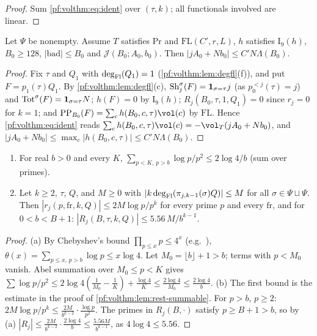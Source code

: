 \begin{proof}
Sum \eqref{pf:volthm:eq:ident} over $(\tau,k)$; all functionals involved are linear.
\end{proof}

\begin{lemma}\label{pf:volthm:lem:flat}
Let $\Psi$ be nonempty. Assume $T$ satisfies $\mathrm{Pr}$ and $\mathrm{FL}(C',r,L)$, $h$ satisfies
$\mathrm{I}_9(h)$, $B_0\ge128$, $|\mathrm{bad}|\le B_0$ and $\mathcal J(B_0;A_0,b_0)$. Then
$|jA_0+Nb_0|\le C'N\Lambda(B_0)$.
\end{lemma}

\begin{proof}
Fix $\tau$ and $Q_1$ with $\deg_{\mathrm{Fl}}(Q_1)=1$ (\cref{pf:volthm:lem:degfl}(f)), and put $F=p_1(\tau)Q_1$. By
\cref{pf:volthm:lem:degfl}(c), $\mathrm{Sh}_j^\sigma(F)=\mathbf 1_{\sigma=\tau}j$ (as $p^{<j}_0(\tau)=j$) and
$\mathrm{Tot}^\sigma(F)=\mathbf 1_{\sigma=\tau}N$; $h(F)=0$ by $\mathrm{I}_9(h)$; $R_j(B_0,\tau,1,Q_1)=0$ since $r_j=0$
for $k=1$; and $\volthmPP_{B_0}(F)=\sum_ch(B_0,c,\tau)\vol(c)$ by $\mathrm{FL}$. Hence \eqref{pf:volthm:eq:ident}
reads $\sum_ch(B_0,c,\tau)\vol(c)=-\vol_T(jA_0+Nb_0)$, and $|jA_0+Nb_0|\le\max_c|h(B_0,c,\tau)|\le C'N\Lambda(B_0)$.
\end{proof}

\begin{lemma}\label{pf:volthm:lem:primesums}
\begin{enumerate}[label=(\alph*)]
\item For real $b>0$ and every $K$, $\sum_{p<K,\ p>b}\log p/p^2\le2\log4/b$ (sum over primes).
\item Let $k\ge2$, $\tau$, $Q$, and $M\ge0$ with $|k\deg_{\mathrm{Fl}}(\pi_{j,k-1}(\sigma)Q)|\le M$ for all $\sigma\in\Psi\sqcup
  \Psi$. Then $|r_j(p,\mathrm{fr},k,Q)|\le2M\log p/p^k$ for every prime $p$ and every $\mathrm{fr}$, and for
  $0<b<B+1$: $|R_j(B,\tau,k,Q)|\le5.56\,M/b^{k-1}$.
\end{enumerate}
\end{lemma}

\begin{proof}
(a) By Chebyshev's bound $\prod_{p\le x}p\le4^x$ (e.g.\ \cite[Thm.~415]{HardyWright2008}),
$\theta(x)=\sum_{p\le x,\,p>b}\log p\le x\log4$. Let $M_0=\lfloor b\rfloor+1>b$; terms with $p<M_0$ vanish. Abel
summation over $M_0\le p<K$ gives
$\sum\log p/p^2\le2\log4(\frac1{M_0}-\frac1K)+\frac{\log4}K\le\frac{2\log4}{M_0}\le\frac{2\log4}b$.
(b) The first bound is the estimate in the proof of \cref{pf:volthm:lem:rest-summable}. For $p>b$, $p\ge2$:
$2M\log p/p^k\le\frac{2M}{b^{k-2}}\cdot\frac{\log p}{p^2}$. The primes in $R_j(B,\cdot)$ satisfy $p\ge B+1>b$, so by (a)
$|R_j|\le\frac{2M}{b^{k-2}}\cdot\frac{2\log4}b\le\frac{5.56M}{b^{k-1}}$, as $4\log4\le5.56$.
\end{proof}

